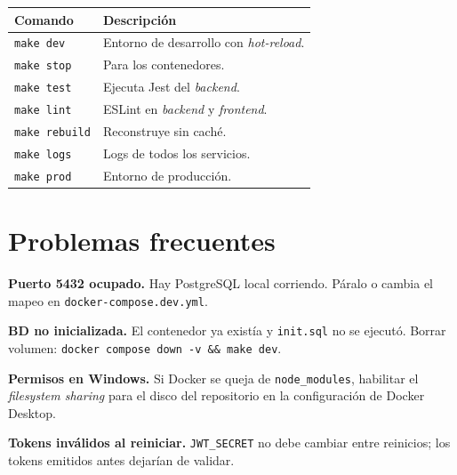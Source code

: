 \begin{table}[H]
\centering
\small
\begin{tabular}{@{}L{4cm}L{8cm}@{}}
\toprule
\textbf{Comando} & \textbf{Descripción} \\
\midrule
\texttt{make dev}      & Entorno de desarrollo con \textit{hot-reload}. \\
\texttt{make stop}     & Para los contenedores. \\
\texttt{make test}     & Ejecuta Jest del \textit{backend}. \\
\texttt{make lint}     & ESLint en \textit{backend} y \textit{frontend}. \\
\texttt{make rebuild}  & Reconstruye sin caché. \\
\texttt{make logs}     & Logs de todos los servicios. \\
\texttt{make prod}     & Entorno de producción. \\
\bottomrule
\end{tabular}
\end{table}


\section*{Problemas frecuentes}

\textbf{Puerto 5432 ocupado.}  Hay PostgreSQL local corriendo. Páralo o cambia el mapeo en \texttt{docker-compose.dev.yml}.

\textbf{BD no inicializada.}  El contenedor ya existía y \texttt{init.sql} no se ejecutó. Borrar volumen: \texttt{docker compose down -v \&\& make dev}.

\textbf{Permisos en Windows.}  Si Docker se queja de \texttt{node\_modules}, habilitar el \textit{filesystem sharing} para el disco del repositorio en la configuración de Docker Desktop.

\textbf{Tokens inválidos al reiniciar.}  \texttt{JWT\_SECRET} no debe cambiar entre reinicios; los tokens emitidos antes dejarían de validar.
